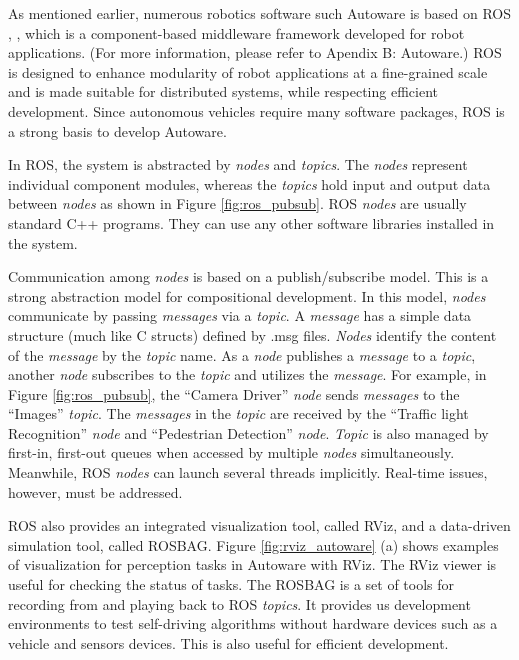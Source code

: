 As mentioned earlier, numerous robotics software such Autoware \cite{autoware} is based on ROS \cite{quigley2009ros},
\cite{rosorg}, which is a component-based middleware framework developed
for robot applications. 
(For more information, please refer to Apendix B: Autoware.)
ROS is designed to enhance modularity of robot applications at a
fine-grained scale and is made suitable for distributed systems, while
respecting efficient development.
Since autonomous vehicles require many software packages, ROS is a
strong basis to develop Autoware.

In ROS, the system is abstracted by \emph{nodes} and \emph{topics}.
The \emph{nodes} represent individual component modules, whereas the \emph{topics} hold input and output data between \emph{nodes} as shown in Figure \ref{fig:ros_pubsub}.
ROS \emph{nodes} are usually standard C++ programs.
They can use any other software libraries installed in the system.

Communication among \emph{nodes} is based on a publish/subscribe model.
This is a strong abstraction model for compositional development.
In this model, \emph{nodes} communicate by passing \emph{messages} via a \emph{topic}. 
A \emph{message} has a simple data structure (much like C structs) defined by .msg files.
\emph{Nodes} identify the content of the \emph{message} by the \emph{topic} name.
As a \emph{node} publishes a \emph{message} to a \emph{topic}, another \emph{node} subscribes to the \emph{topic} and utilizes the \emph{message}. 
For example, in Figure \ref{fig:ros_pubsub}, the ``Camera Driver'' \emph{node} sends \emph{messages} to the ``Images'' \emph{topic}. 
The \emph{messages} in the \emph{topic} are received by the ``Traffic light Recognition'' \emph{node} and ``Pedestrian Detection'' \emph{node}.
\emph{Topic} is also managed by first-in, first-out queues when accessed by multiple \emph{nodes} simultaneously.
Meanwhile, ROS \emph{nodes} can launch several threads implicitly.
Real-time issues, however, must be addressed.

ROS also provides an integrated visualization tool, called RViz, and a
data-driven simulation tool, called ROSBAG. 
Figure \ref{fig:rviz_autoware} (a) shows examples of visualization for perception tasks in Autoware with RViz.
The RViz viewer is useful for checking the status of tasks.
The ROSBAG is a set of tools for recording from and playing back to ROS \emph{topics}.
It provides us development environments to test self-driving algorithms without hardware devices such as a vehicle and sensors devices.
This is also useful for efficient development.

